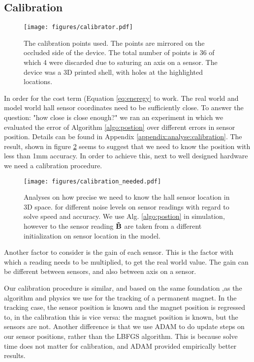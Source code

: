 \subsection{Calibration}
\begin{figure}
    \centering
    \texttt{[image: figures/calibrator.pdf]}
    \caption{The calibration points used. The points are mirrored on the occluded side of the device. The total number of points is 36 of which 4 were discarded due to saturing an axis on a sensor. The device was a 3D printed shell, with holes at the highlighted locations.}
    \label{fig:my_label}
\end{figure}

In order for the cost term (Equation \ref{eq:eneregy} to work. The real world and model world hall sensor coordinates need to be sufficiently close. To answer the question: "how close is close enough?" we ran an experiment in which we evaluated the error of Algorithm \ref{algo:postion} over different errors in sensor position. Details can be found in Appendix \ref{appendix:analyse:calibration}. The result, shown in figure \ref{fig:calibration_accuracy_needed} seems to suggest that we need to know the position with less than 1mm accuracy. In order to achieve this, next to well designed hardware we need a calibration procedure. 

\begin{figure}
    \centering
    \texttt{[image: figures/calibration\_needed.pdf]}
    \caption{Analyses on how precise we need to know the hall sensor location in 3D space. for different noise levels on sensor readings with regard to solve speed and accuracy. We use Alg. \ref{algo:postion} in simulation, however to the sensor reading $\mathbf{\Tilde{B}}$ are taken from a different initialization on sensor location in the model.}
    \label{fig:calibration_accuracy_needed}
\end{figure}

Another factor to consider is the gain of each sensor. This is the factor with which a reading needs to be multiplied, to get the real world value. The gain can be different between sensors, and also between axis on a sensor.

Our calibration procedure is similar, and based on the same foundation ,as the algorithm and physics we use for the tracking of a permanent magnet. In the tracking case, the sensor position is known and the magnet position is regressed to, in the calibration this is vice versa: the magnet position is known, but the sensors are not. Another difference is that we use ADAM to do update steps on our sensor positions, rather than the LBFGS algorithm. This is because solve time does not matter for calibration, and ADAM provided empirically better results.

